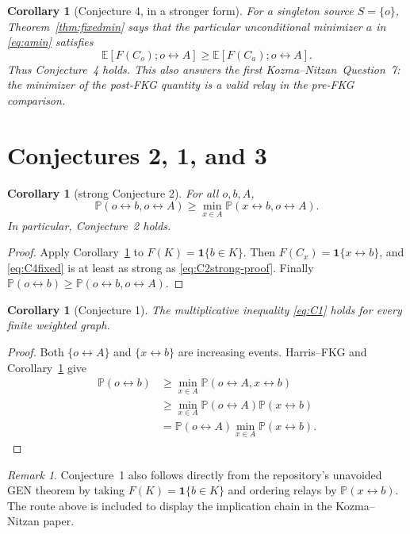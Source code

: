 \documentclass[11pt]{article}
\newtheorem{corollary}[theorem]{Corollary}
\theoremstyle{definition}
\theoremstyle{remark}
\newtheorem{remark}[theorem]{Remark}
\newcommand{\PP}{\mathbb P}
\newcommand{\EE}{\mathbb E}
\newcommand{\one}{\mathbf 1}
\newcommand{\con}{\leftrightarrow}
\newcommand{\KN}{Kozma--Nitzan}
\begin{document}
\begin{corollary}[Conjecture 4, in a stronger form]\label{cor:C4}
For a singleton source $S=\{o\}$, Theorem~\ref{thm:fixedmin} says that the
particular unconditional minimizer $a$ in \eqref{eq:amin} satisfies
\begin{equation}\label{eq:C4fixed}
 \EE[F(C_o);o\con A]\geq\EE[F(C_a);o\con A].
\end{equation}
Thus Conjecture~4 holds.  This also answers the first \KN\ Question~7:
the minimizer of the post-FKG quantity is a valid relay in the pre-FKG
comparison.
\end{corollary}

\section{Conjectures 2, 1, and 3}\label{sec:C123}

\begin{corollary}[strong Conjecture 2]\label{cor:C2}
For all $o,b,A$,
\begin{equation}\label{eq:C2strong-proof}
 \PP(o\con b,o\con A)
 \geq \min_{x\in A}\PP(x\con b,o\con A).
\end{equation}
In particular, Conjecture~2 holds.
\end{corollary}

\begin{proof}
Apply Corollary~\ref{cor:C4} to
$F(K)=\one\{b\in K\}$.  Then $F(C_x)=\one\{x\con b\}$, and
\eqref{eq:C4fixed} is at least as strong as
\eqref{eq:C2strong-proof}.  Finally
$\PP(o\con b)\geq\PP(o\con b,o\con A)$.
\end{proof}

\begin{corollary}[Conjecture 1]\label{cor:C1}
The multiplicative inequality \eqref{eq:C1} holds for every finite
weighted graph.
\end{corollary}

\begin{proof}
Both $\{o\con A\}$ and $\{x\con b\}$ are increasing events.  Harris--FKG
and Corollary~\ref{cor:C2} give
\begin{align*}
 \PP(o\con b)
 &\geq\min_{x\in A}\PP(o\con A,x\con b)\\
 &\geq\min_{x\in A}\PP(o\con A)\PP(x\con b)\\
 &=\PP(o\con A)\min_{x\in A}\PP(x\con b).
\end{align*}
\end{proof}

\begin{remark}
Conjecture~1 also follows directly from the repository's unavoided GEN
theorem by taking $F(K)=\one\{b\in K\}$ and ordering relays by
$\PP(x\con b)$.  The route above is included to display the implication
chain in the Kozma--Nitzan paper.
\end{remark}
\end{document}
